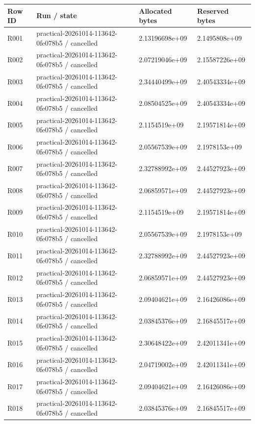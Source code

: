 \documentclass[10pt]{article}
\begin{document}
{\scriptsize\setlength{\tabcolsep}{2pt}
\begin{longtable}{p{}p{}p{}p{}}
Row ID & Run / state & Allocated bytes & Reserved bytes \\
\hline\endhead
R001 & practical-20261014-113642-0fe078b5 / cancelled & 2.13196698e+09 & 2.1495808e+09 \\
R002 & practical-20261014-113642-0fe078b5 / cancelled & 2.07219046e+09 & 2.15587226e+09 \\
R003 & practical-20261014-113642-0fe078b5 / cancelled & 2.34440499e+09 & 2.40543334e+09 \\
R004 & practical-20261014-113642-0fe078b5 / cancelled & 2.08504525e+09 & 2.40543334e+09 \\
R005 & practical-20261014-113642-0fe078b5 / cancelled & 2.1154519e+09 & 2.19571814e+09 \\
R006 & practical-20261014-113642-0fe078b5 / cancelled & 2.05567539e+09 & 2.1978153e+09 \\
R007 & practical-20261014-113642-0fe078b5 / cancelled & 2.32788992e+09 & 2.44527923e+09 \\
R008 & practical-20261014-113642-0fe078b5 / cancelled & 2.06859571e+09 & 2.44527923e+09 \\
R009 & practical-20261014-113642-0fe078b5 / cancelled & 2.1154519e+09 & 2.19571814e+09 \\
R010 & practical-20261014-113642-0fe078b5 / cancelled & 2.05567539e+09 & 2.1978153e+09 \\
R011 & practical-20261014-113642-0fe078b5 / cancelled & 2.32788992e+09 & 2.44527923e+09 \\
R012 & practical-20261014-113642-0fe078b5 / cancelled & 2.06859571e+09 & 2.44527923e+09 \\
R013 & practical-20261014-113642-0fe078b5 / cancelled & 2.09404621e+09 & 2.16426086e+09 \\
R014 & practical-20261014-113642-0fe078b5 / cancelled & 2.03845376e+09 & 2.16845517e+09 \\
R015 & practical-20261014-113642-0fe078b5 / cancelled & 2.30648422e+09 & 2.42011341e+09 \\
R016 & practical-20261014-113642-0fe078b5 / cancelled & 2.04719002e+09 & 2.42011341e+09 \\
R017 & practical-20261014-113642-0fe078b5 / cancelled & 2.09404621e+09 & 2.16426086e+09 \\
R018 & practical-20261014-113642-0fe078b5 / cancelled & 2.03845376e+09 & 2.16845517e+09 \\

\end{longtable}}
\end{document}
